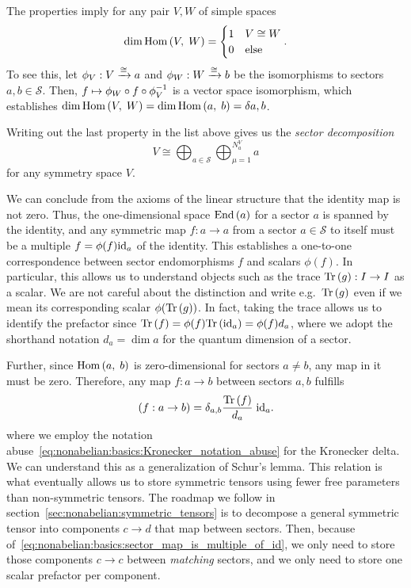 The properties imply for any pair $V, W$ of simple spaces
\begin{equation}
    \dim \mathrm{Hom}\left(V,\; W\right) = \begin{cases}1 & V \cong W \\ 0 & \text{else}\end{cases}
    .
\end{equation}
%
To see this, let $\phi_V : V \xrightarrow{\cong} a$ and $\phi_W : W \xrightarrow{\cong} b$ be the isomorphisms to sectors $a, b \in \mathcal{S}$.
%
Then, $f \mapsto \phi_W \circ f \circ \phi_V^{-1}$ is a vector space isomorphism, which establishes $\dim\mathrm{Hom}\left(V,\; W\right) = \dim\mathrm{Hom}\left(a,\; b\right) = \delta{a,b}$.

Writing out the last property in the list above gives us the \emph{sector decomposition}
\begin{equation}
    \label{eq:nonabelian:basics:sector_decomposition_general_space}
    V \cong \bigoplus_{a \in \mathcal{S}} \bigoplus_{\mu = 1}^{N^{V}_a} a
\end{equation}
for any symmetry space $V$.


We can conclude from the axioms of the linear structure that the identity map is not zero.
%
Thus, the one-dimensional space $\mathrm{End}\left(a\right)$ for a sector $a$ is spanned by the identity, and any symmetric map $f: a \to a$ from a sector $a \in \mathcal{S}$ to itself must be a multiple $f = \phi(f) \mathrm{id}_{a}$ of the identity.
%
This establishes a one-to-one correspondence between sector endomorphisms $f$ and scalars $\phi(f)$.
%
In particular, this allows us to understand objects such as the trace $\mathrm{Tr}\left( {g} \right) : I \to I$ as a scalar.
%
We are not careful about the distinction and write e.g.~$\mathrm{Tr}\left( {g} \right)$ even if we mean its corresponding scalar $\phi(\mathrm{Tr}\left( {g} \right))$.
%
In fact, taking the trace allows us to identify the prefactor since $\mathrm{Tr}\left( {f} \right) = \phi(f) \mathrm{Tr}\left( {\mathrm{id}_{a}} \right) = \phi(f) d_a$, where we adopt the shorthand notation $d_a = \dim a$ for the quantum dimension of a sector.

Further, since $\mathrm{Hom}\left(a,\; b\right)$ is zero-dimensional for sectors $a \neq b$, any map in it must be zero.
%
Therefore, any map $f: a \to b$ between sectors $a, b$ fulfills
\begin{equation}
    \label{eq:nonabelian:basics:sector_map_is_multiple_of_id}
    (f: a \to b)
    = \delta_{a, b} \frac{\mathrm{Tr}\left( {f} \right)}{d_a}\; \mathrm{id}_{a}
    .
\end{equation}
where we employ the notation abuse~\eqref{eq:nonabelian:basics:Kronecker_notation_abuse} for the Kronecker delta.
%
We can understand this as a generalization of Schur's lemma.
%
This relation is what eventually allows us to store symmetric tensors using fewer free parameters than non-symmetric tensors.
%
The roadmap we follow in section~\ref{sec:nonabelian:symmetric_tensors} is to decompose a general symmetric tensor into components $c \to d$ that map between sectors. Then, because of~\eqref{eq:nonabelian:basics:sector_map_is_multiple_of_id}, we only need to store those components $c \to c$ between \emph{matching} sectors, and we only need to store one scalar prefactor per component.

